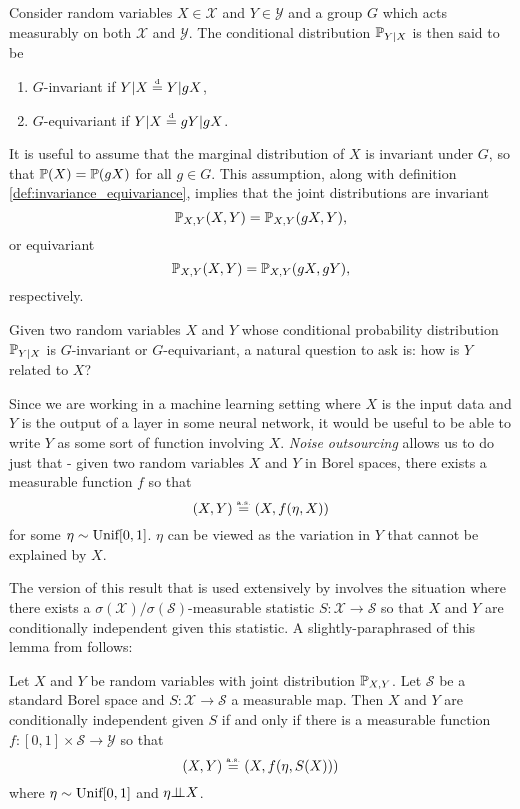 \begin{definition} \label{def:invariance_equivariance}
Consider random variables $X \in \mathcal{X}$ and $Y \in \mathcal{Y}$ and a group $G$ which acts measurably on both $\mathcal{X}$ and $\mathcal{Y}$.
The conditional distribution $\mathbb{P}_{Y|X}$ is then said to be
\begin{enumerate} 
	\item $G$-invariant if $Y|X \stackrel{\text{\rm\tiny d}}{=} Y| gX$,
	\item $G$-equivariant if $Y|X \stackrel{\text{\rm\tiny d}}{=} gY | gX$.
\end{enumerate}
\end{definition}
It is useful to assume that the marginal distribution of $X$ is invariant under $G$, so that $\mathbb{P}(X) = \mathbb{P}(gX)$ for all $g \in G$.
This assumption, along with definition \ref{def:invariance_equivariance}, implies that the joint distributions are invariant
$$
	\mathbb{P}_{X,Y}(X,Y) = \mathbb{P}_{X,Y}(g X, Y),
$$
or equivariant
$$
	\mathbb{P}_{X,Y}(X,Y) = \mathbb{P}_{X,Y}(g X, g Y),
$$
respectively.

Given two random variables $X$ and $Y$ whose conditional probability distribution $\mathbb{P}_{Y|X}$ is $G$-invariant or $G$-equivariant, a natural question to ask is: how is $Y$ related to $X$?


Since we are working in a machine learning setting where $X$ is the input data and $Y$ is the output of a layer in some neural network, it would be useful to be able to write $Y$ as some sort of function involving $X$.
\textit{Noise outsourcing} allows us to do just that - given two random variables $X$ and $Y$ in Borel spaces, there exists a measurable function $f$ so that
$$
	(X,Y) \stackrel{\text{\rm\tiny a.s.}}{=} (X,f(\eta,X))
$$
for some $\eta \sim \text{\rm Unif}[0,1]$.
$\eta$ can be viewed as the variation in $Y$ that cannot be explained by $X$.

The version of this result that is used extensively by \cite{bloemreddy2019probabilistic} involves the situation where there exists a $\sigma(\mathcal{X})/\sigma(\mathcal{S})$-measurable statistic $S: \mathcal{X} \to \mathcal{S}$ so that $X$ and $Y$ are conditionally independent given this statistic.
A slightly-paraphrased of this lemma from \cite{bloemreddy2019probabilistic} follows:
\begin{lemma}
	Let $X$ and $Y$ be random variables with joint distribution $\mathbb{P}_{X,Y}$.
	Let $\mathcal{S}$ be a standard Borel space and $S: \mathcal{X} \to \mathcal{S}$ a measurable map.
	Then $X$ and $Y$ are conditionally independent given $S$ if and only if there is a measurable function $f: [0,1] \times \mathcal{S} \to \mathcal{Y}$ so that
	$$
		(X,Y) \stackrel{\text{\rm\tiny a.s.}}{=} (X,f(\eta,S(X)))
	$$
	where $\eta \sim \text{\rm Unif}[0,1]$ and $\eta {\perp\!\!\!\perp} X$.
\end{lemma}

